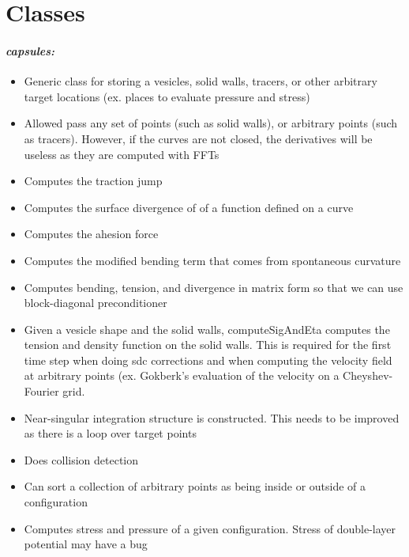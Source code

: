 \documentclass[12pt]{article}
\begin{document}
\section{Classes}
\paragraph{\emph{capsules:}}
\begin{itemize}
\item Generic class for storing a vesicles, solid walls, tracers, or
other arbitrary target locations (ex. places to evaluate pressure and
stress)
\item Allowed pass any set of points (such as solid walls), or arbitrary
points (such as tracers).  However, if the curves are not closed, the
derivatives will be useless as they are computed with FFTs
\item Computes the traction jump 
\item Computes the surface divergence of of a function defined on a
curve
\item Computes the ahesion force
\item Computes the modified bending term that comes from spontaneous
curvature
\item Computes bending, tension, and divergence in matrix form so that
we can use block-diagonal preconditioner
\item Given a vesicle shape and the solid walls, computeSigAndEta
computes the tension and density function on the solid walls.  This is
required for the first time step when doing sdc corrections and when
computing the velocity field at arbitrary points (ex. Gokberk's
evaluation of the velocity on a Cheyshev-Fourier grid.
\item Near-singular integration structure is constructed.  This needs to
be improved as there is a loop over target points
\item Does collision detection
\item Can sort a collection of arbitrary points as being inside or
outside of a configuration
\item Computes stress and pressure of a given configuration.  Stress of
double-layer potential may have a bug
\end{itemize}
\end{document}
